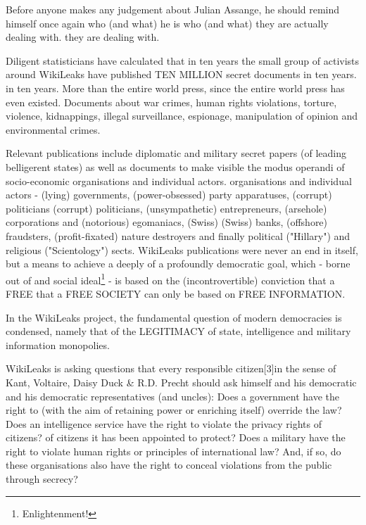 \begin{multicols}{2}
Before anyone makes any judgement about Julian
Assange, he should remind himself once again who (and what) he is
who (and what) they are actually dealing with.
they are dealing with.

Diligent statisticians have calculated that in ten years the small group of activists around WikiLeaks have published
TEN MILLION secret documents in ten years.
in ten years. More than the entire world press, since the entire
world press has even existed. Documents about war crimes, human rights violations, torture, violence,
kidnappings, illegal surveillance, espionage, manipulation of opinion and environmental crimes.

Relevant publications include diplomatic and military secret papers (of leading belligerent states) as well as documents to make visible the modus operandi of socio-economic organisations and individual actors.
organisations and individual actors - (lying) governments, (power-obsessed) party apparatuses, (corrupt) politicians
(corrupt) politicians, (unsympathetic) entrepreneurs, (arsehole)
corporations and (notorious) egomaniacs, (Swiss)
(Swiss) banks, (offshore) fraudsters, (profit-fixated) nature destroyers and finally political ("Hillary") and religious
("Scientology") sects. WikiLeaks publications were
never an end in itself, but a means to achieve a deeply
of a profoundly democratic goal, which - borne out of
and social ideal\footnote[2]{Enlightenment!} - is based on the (incontrovertible) conviction that a FREE
that a FREE SOCIETY can only be based on
FREE INFORMATION.

In the WikiLeaks project, the fundamental question of modern democracies is condensed, namely that of
the LEGITIMACY of state, intelligence and military information monopolies.

WikiLeaks is asking questions that every responsible 
citizen[3]{in the sense of Kant, Voltaire, Daisy Duck \& R.D. Precht} should ask himself and his democratic
and his democratic representatives (and uncles): Does a government have the right to
(with the aim of retaining power or enriching itself)
override the law? Does an intelligence service have the right to violate the privacy rights of citizens?
of citizens it has been appointed to protect?
Does a military have the right to violate human rights or principles of international law? And, if so,
do these organisations also have the right to conceal
violations from the public through secrecy?


\end{multicols}

